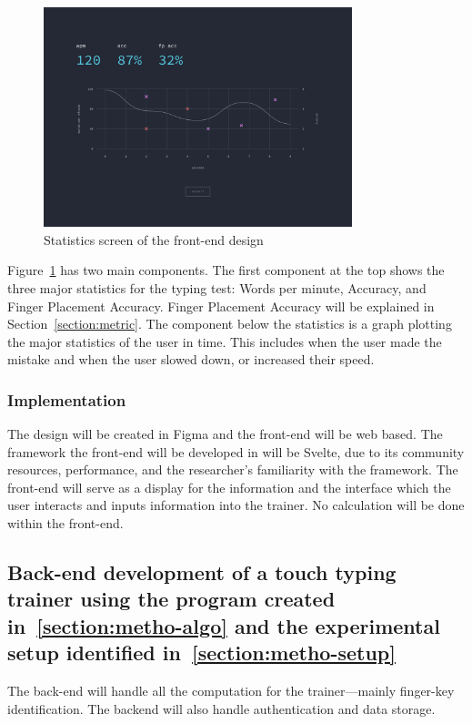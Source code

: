 \documentclass{report}
\begin{document}
\begin{figure}[H]
	\centering
	\includegraphics[width=0.8\textwidth]{ui-stats.png}
	\caption{Statistics screen of the front-end design}
	\label{fig:ui-stat}
	\centering
\end{figure}

Figure~\ref{fig:ui-stat} has two main components. The first component at the top
shows the three major statistics for the typing test: Words per minute,
Accuracy, and Finger Placement Accuracy. Finger Placement Accuracy will be
explained in Section~\ref{section:metric}. The component below the statistics is a
graph plotting the major statistics of the user in time. This includes when the
user made the mistake and when the user slowed down, or increased their speed.

\subsubsection{Implementation}
The design will be created in Figma and the front-end will be web based. The
framework the front-end will be developed in will be Svelte, due to its
community resources, performance, and the researcher's familiarity with the
framework. The front-end will serve as a display for the information and the
interface which the user interacts and inputs information into the trainer. No
calculation will be done within the front-end.

\subsection{Back-end development of a touch typing trainer using the program created
	in~\ref{section:metho-algo} and the experimental setup identified in~\ref{section:metho-setup}}

The back-end will handle all the computation for the trainer---mainly
finger-key identification. The backend will also handle authentication and data
storage.
\end{document}
